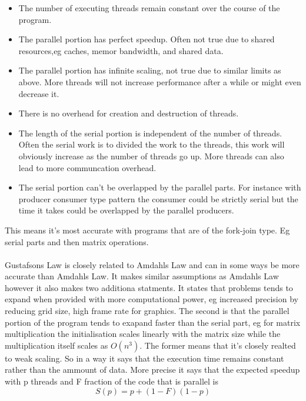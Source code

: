 \documentclass[10pt,a4paper]{article}
\begin{document}
\begin{itemize}
  \item The number of executing threads remain constant over the course of the program.
  \item The parallel portion has perfect speedup. Often not true due to shared resources,eg caches, memor bandwidth, and shared data.
  \item The parallel portion has infinite scaling, not true due to similar limits as above. More threads will not increase performance after a while or might even decrease it.
  \item There is no overhead for creation and destruction of threads.
  \item The length of the serial portion is independent of the number of threads. Often the serial work is to divided the work to the threads, this work will obviously increase as the number of threads go up. More threads can also lead to more communcation overhead.
  \item The serial portion can't be overlapped by the parallel parts. For instance with producer consumer type pattern the consumer could be strictly serial but the time it takes could be overlapped by the parallel producers.
\end{itemize}

This means it's most accurate with programs that are of the fork-join type. Eg serial parts and then matrix operations.\\
\\
Gustafsons Law is closely related to Amdahls Law and can in some ways be more accurate than Amdahls Law. It makes similar assumptions as Amdahls Law however it also makes two additiona statments. It states that problems tends to expand when provided with more computational power, eg increased precision by reducing grid size, high frame rate for graphics. The second is that the parallel portion of the program tends to exapand faster than the serial part, eg for matrix multiplication the initialisation scales linearly with the matrix size while the multiplication itself scales as $O(n^3)$. The former means that it's closely realted to weak scaling. So in a way it says that the execution time remains constant rather than the ammount of data. More precise it says that the expected speedup with p threads and F fraction of the code that is parallel is\cite{gustafson1988reevaluating, cuda_best_practice}
$$S(p)=p+(1-F)(1-p)$$
\end{document}
